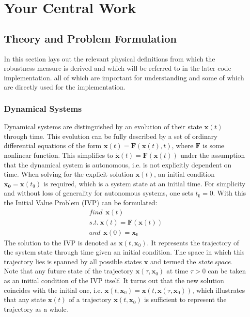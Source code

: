 \chapter{Your Central Work}

\section{Theory and Problem Formulation}

    In this section lays out the relevant physical definitions from which the robustness measure is derived and which will be referred to in the later code implementation. all of which are important for understanding and some of which are directly used for the implementation. 

\subsection{Dynamical Systems} \label{dynamicstheory}
    
    Dynamical systems are distinguished by an evolution of their state $\mathbf{x}(t)$ through time. This evolution can be fully described by a set of ordinary differential equations of the form $\dot{\mathbf{x}}(t) = \mathbf{F}(\mathbf{x}(t),t)$, where $\mathbf{F}$ is some nonlinear function. This simplifies to $\dot{\mathbf{x}}(t) = \mathbf{F}(\mathbf{x}(t))$ under the assumption that the dynamical system is autonomous, i.e. is not explicitly dependent on time. 
    When solving for the explicit solution $\mathbf{x}(t)$, an initial condition $\mathbf{x_0}=\mathbf{x}(t_0)$ is required, which is a system state at an initial time. For simplicity and without loss of generality for autonomous systems, one sets $t_0 = 0$. With this the Initial Value Problem (IVP) can be formulated: \begin{gather} \label{eq:1} find \ \ \mathbf{x}(t) \\ s.t. \ \dot{\mathbf{x}}(t) = \mathbf{F}(\mathbf{x}(t)) \\ and \ \ \mathbf{x}(0) = \mathbf{x}_0 \end{gather}
    The solution to the IVP is denoted as $\mathbf{x}(t,\mathbf{x}_0)$. It represents the trajectory of the system state through time given an initial condition. The space in which this trajectory lies is spanned by all possible states $\mathbf{x}$ and termed the $state\ space$. Note that any future state of the trajectory $\mathbf{x}(\tau,\mathbf{x}_0)$ at time $\tau > 0$ can be taken as an initial condition of the IVP itself. It turns out that the new solution coincides with the initial one, i.e. $\mathbf{x}(t,\mathbf{x}_0) = \mathbf{x}(t,\mathbf{x}(\tau,\mathbf{x}_0))$, which illustrates that any state $\mathbf{x}(t)$ of a trajectory $\mathbf{x}(t,\mathbf{x}_0)$ is sufficient to represent the trajectory as a whole.
    
